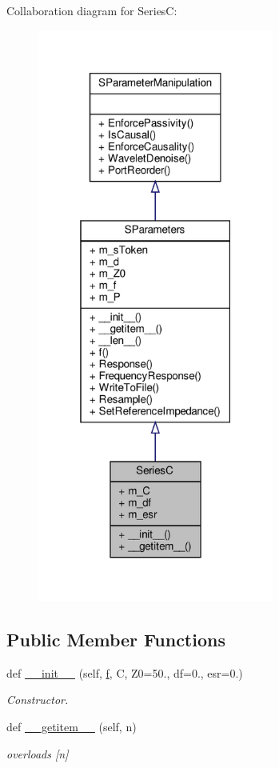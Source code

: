 Collaboration diagram for SeriesC\+:
\nopagebreak
\begin{figure}[H]
\begin{center}
\leavevmode
\includegraphics[width=220pt]{classSignalIntegrity_1_1SParameters_1_1Devices_1_1SeriesC_1_1SeriesC__coll__graph}
\end{center}
\end{figure}
\subsection*{Public Member Functions}
\begin{DoxyCompactItemize}
\item 
def \hyperlink{classSignalIntegrity_1_1SParameters_1_1Devices_1_1SeriesC_1_1SeriesC_a441cc92ccb545fe35cb1959bbef689b0}{\+\_\+\+\_\+init\+\_\+\+\_\+} (self, \hyperlink{classSignalIntegrity_1_1SParameters_1_1SParameters_1_1SParameters_a32e7a34d6837fe949b413c852a0447f8}{f}, C, Z0=50., df=0., esr=0.)
\begin{DoxyCompactList}\small\item\em Constructor. \end{DoxyCompactList}\item 
def \hyperlink{classSignalIntegrity_1_1SParameters_1_1Devices_1_1SeriesC_1_1SeriesC_ab7a6da5139e0878b590d68292aaa70f2}{\+\_\+\+\_\+getitem\+\_\+\+\_\+} (self, n)
\begin{DoxyCompactList}\small\item\em overloads \mbox{[}n\mbox{]} \end{DoxyCompactList}\end{DoxyCompactItemize}


